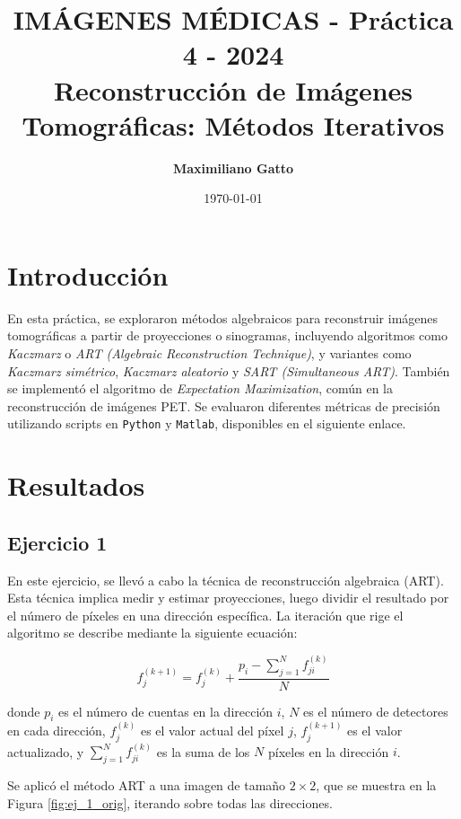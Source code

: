 \documentclass[11pt, twocolumn]{article}
\title{{\large IMÁGENES MÉDICAS - Práctica 4 - 2024} \\ \vspace{1cm}\textbf{Reconstrucción de Imágenes Tomográficas: Métodos Iterativos}}
\author[ ]{\textbf{Maximiliano Gatto}}
\affil[ ]{Instituto Balseiro (UNCuyo - CNEA) - Bariloche, Río Negro, Argentina\vspace{0.4cm}}
\affil[ ]{\href{mailto:maximiliano.gatto@ib.edu.ar}{maximiliano.gatto@ib.edu.ar}}
\date{\today}
\begin{document}
\maketitle

\section{Introducción}
En esta práctica, se exploraron métodos algebraicos para reconstruir imágenes tomográficas a partir de proyecciones o sinogramas, incluyendo algoritmos como \textit{Kaczmarz} o \textit{ART (Algebraic Reconstruction Technique)}, y variantes como \textit{Kaczmarz simétrico}, \textit{Kaczmarz aleatorio} y \textit{SART (Simultaneous ART)}. También se implementó el algoritmo de \textit{Expectation Maximization}, común en la reconstrucción de imágenes PET. Se evaluaron diferentes métricas de precisión utilizando scripts en \texttt{Python} y \texttt{Matlab}, disponibles en el siguiente enlace.

\section{Resultados}

\subsection*{Ejercicio 1}
En este ejercicio, se llevó a cabo la técnica de reconstrucción algebraica (ART). Esta técnica implica medir y estimar proyecciones, luego dividir el resultado por el número de píxeles en una dirección específica. La iteración que rige el algoritmo se describe mediante la siguiente ecuación:

\begin{equation}  \label{eq:ART}
  f^{(k+1)}_j = f^{(k)}_j + \frac{p_i - \sum_{j=1}^N f_{ji}^{(k)}}{N}
\end{equation}

\noindent donde $p_i$ es el número de cuentas en la dirección $i$, $N$ es el número de detectores en cada dirección, $f^{(k)}_j$ es el valor actual del píxel $j$, $f^{(k+1)}_j$ es el valor actualizado, y $\sum_{j=1}^N f_{ji}^{(k)}$ es la suma de los $N$ píxeles en la dirección $i$.

Se aplicó el método ART a una imagen de tamaño $2\times2$, que se muestra en la Figura \ref{fig:ej_1_orig}, iterando sobre todas las direcciones.
\end{document}
